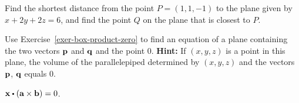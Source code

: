 \begin{ex}
  Find the shortest distance from the point $P = (1,1,-1)$ to the plane
  given by $x + 2y + 2z = 6$, and find the point $Q$ on the plane
  that is closest to $P$.
\end{ex}

\begin{ex}
  Use Exercise~\ref{exer-box-product-zero} to find an equation of a
  plane containing the two vectors $\vect{p}$ and $\vect{q}$ and the
  point $0$. \textbf{Hint:} If $(x,y,z)$ is a point in this
  plane, the volume of the parallelepiped determined by $(x,y,z)$
  and the vectors $\vect{p}$, $\vect{q}$ equals 0.
  \begin{sol}
    $\vect{x}\dotprod (\vect{a}\times \vect{b}) =0$.
  \end{sol}
\end{ex}

